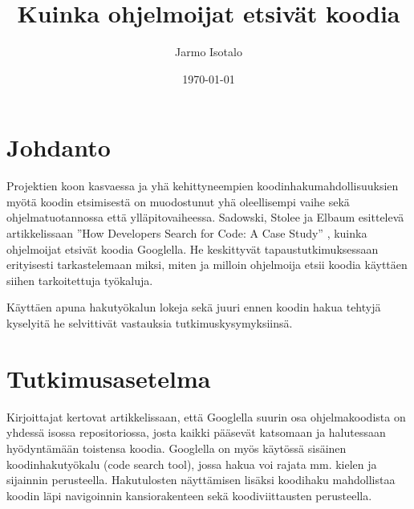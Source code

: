 \documentclass[finnish]{../tktltiki2}
\title{Kuinka ohjelmoijat etsivät koodia}
\author{Jarmo Isotalo}
\date{\today}
\theoremstyle{definition}
\theoremstyle{remark}
\begin{document}

\frontmatter      %

\maketitle        %

\tableofcontents  %


\mainmatter       %

\section{Johdanto}

Projektien koon kasvaessa ja yhä kehittyneempien koodinhakumahdollisuuksien myötä koodin etsimisestä on muodostunut yhä oleellisempi vaihe sekä ohjelmatuotannossa että ylläpitovaiheessa. Sadowski, Stolee ja Elbaum esittelevä artikkelissaan ''How Developers Search for Code: A Case Study'' \cite{g_search_code}, kuinka ohjelmoijat etsivät koodia Googlella.
He keskittyvät tapaustutkimuksessaan erityisesti tarkastelemaan miksi, miten ja milloin ohjelmoija etsii koodia käyttäen siihen tarkoitettuja työkaluja.

Käyttäen apuna hakutyökalun lokeja sekä juuri ennen koodin hakua tehtyjä kyselyitä he selvittivät vastauksia tutkimuskysymyksiinsä.

\section{Tutkimusasetelma}

Kirjoittajat kertovat artikkelissaan, että Googlella suurin osa ohjelmakoodista on yhdessä isossa repositoriossa, josta kaikki pääsevät katsomaan ja halutessaan hyödyntämään toistensa koodia. Googlella on myös käytössä sisäinen koodinhakutyökalu (code search tool), jossa hakua voi rajata mm. kielen ja sijainnin perusteella. Hakutulosten näyttämisen lisäksi koodihaku mahdollistaa koodin läpi navigoinnin kansiorakenteen sekä koodiviittausten perusteella. %
\end{document}
